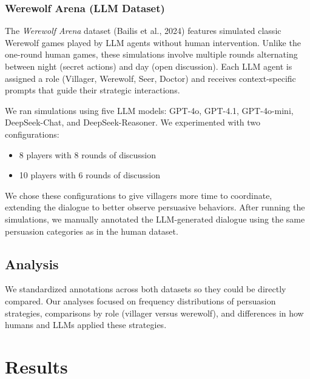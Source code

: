 \documentclass[
  letterpaper,
  DIV=11,
  numbers=noendperiod]{scrreprt}
\begin{document}
\subsection{Werewolf Arena (LLM
Dataset)}\label{werewolf-arena-llm-dataset}

The \emph{Werewolf Arena} dataset (Bailis et al., 2024) features
simulated classic Werewolf games played by LLM agents without human
intervention. Unlike the one-round human games, these simulations
involve multiple rounds alternating between night (secret actions) and
day (open discussion). Each LLM agent is assigned a role (Villager,
Werewolf, Seer, Doctor) and receives context-specific prompts that guide
their strategic interactions.

We ran simulations using five LLM models: GPT-4o, GPT-4.1, GPT-4o-mini,
DeepSeek-Chat, and DeepSeek-Reasoner. We experimented with two
configurations:

\begin{itemize}
\item
  8 players with 8 rounds of discussion
\item
  10 players with 6 rounds of discussion
\end{itemize}

We chose these configurations to give villagers more time to coordinate,
extending the dialogue to better observe persuasive behaviors. After
running the simulations, we manually annotated the LLM-generated
dialogue using the same persuasion categories as in the human dataset.

\section{Analysis}\label{analysis}

We standardized annotations across both datasets so they could be
directly compared. Our analyses focused on frequency distributions of
persuasion strategies, comparisons by role (villager versus werewolf),
and differences in how humans and LLMs applied these strategies.

\chapter{Results}\label{results}
\end{document}
